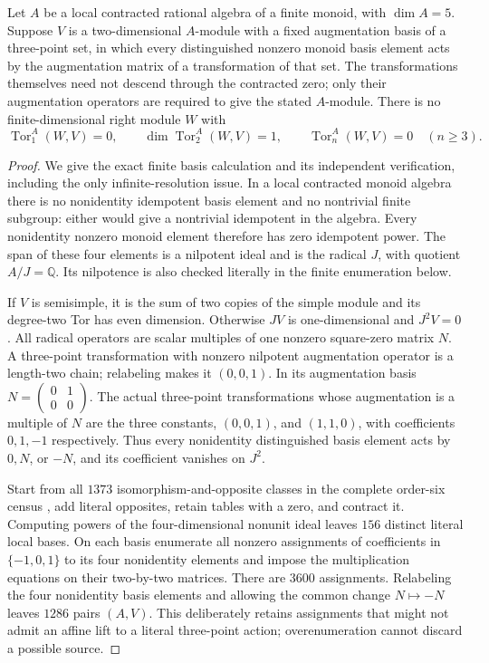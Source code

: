 \begin{proposition}
\label{C:local-five-three-row-Tor}
Let $A$ be a local contracted rational algebra of a finite
monoid, with $\dim A=5$.  Suppose $V$ is a two-dimensional
$A$-module with a fixed augmentation basis of a three-point
set, in which every distinguished nonzero monoid basis element
acts by the augmentation matrix of a transformation of that
set.  The transformations themselves need not descend through
the contracted zero; only their augmentation operators are
required to give the stated $A$-module.
There is no finite-dimensional right module $W$
with
\[
 \operatorname{Tor}_1^A(W,V)=0,\qquad
 \dim\operatorname{Tor}_2^A(W,V)=1,\qquad
 \operatorname{Tor}_n^A(W,V)=0\quad(n\geq3).
\]
\end{proposition}
\begin{proof}
We give the exact finite basis calculation and its independent
verification, including the only infinite-resolution issue.
In a local contracted monoid algebra there is no nonidentity
idempotent basis element and no nontrivial finite subgroup:
either would give a nontrivial idempotent in the algebra.
Every nonidentity nonzero monoid element therefore has zero
idempotent power.  The span of these four elements is a
nilpotent ideal and is the radical $J$, with quotient
$A/J=\mathbb Q$.  Its nilpotence is also checked literally
in the finite enumeration below.

If $V$ is semisimple, it is the sum of two copies of the simple
module and its degree-two Tor has even dimension.  Otherwise
$JV$ is one-dimensional and $J^2V=0$.  All radical operators
are scalar multiples of one nonzero square-zero matrix $N$.
A three-point transformation with nonzero nilpotent augmentation
operator is a length-two chain; relabeling makes it $(0,0,1)$.
In its augmentation basis $N=\left(\begin{smallmatrix}0&1\\0&0\end{smallmatrix}\right)$.
The actual three-point transformations whose augmentation is
a multiple of $N$ are the three constants, $(0,0,1)$, and
$(1,1,0)$, with coefficients $0,1,-1$ respectively.
Thus every nonidentity distinguished basis element acts by
$0,N$, or $-N$, and its coefficient vanishes on $J^2$.

Start from all $1373$ isomorphism-and-opposite classes in the
complete order-six census
, add literal opposites,
retain tables with a zero, and contract it.  Computing powers
of the four-dimensional nonunit ideal leaves $156$ distinct
literal local bases.  On each basis enumerate all nonzero
assignments of coefficients in $\{-1,0,1\}$ to its four
nonidentity elements and impose the multiplication equations
on their two-by-two matrices.  There are $3600$ assignments.
Relabeling the four nonidentity basis elements and allowing the
common change $N\mapsto-N$ leaves $1286$ pairs $(A,V)$.
This deliberately retains assignments that might not admit
an affine lift to a literal three-point action; overenumeration
cannot discard a possible source.


\end{proof}
